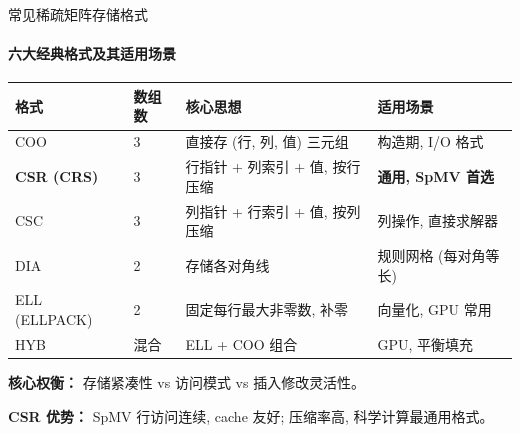 \documentclass[12pt,aspectratio=169]{beamer}
\begin{document}
\begin{frame}[shrink]{常见稀疏矩阵存储格式}
\framesubtitle{六大经典格式及其适用场景}

\footnotesize
\begin{center}
\renewcommand{\arraystretch}{1.15}
\setlength{\tabcolsep}{3pt}
\begin{tabular}{@{}p{2.3cm} p{1.6cm} p{4.6cm} p{3.6cm}@{}}
\toprule
\textbf{格式} & \textbf{数组数} & \textbf{核心思想} & \textbf{适用场景} \\
\midrule
COO              & 3 & 直接存 (行, 列, 值) 三元组             & 构造期, I/O 格式 \\
\textbf{CSR (CRS)} & 3 & 行指针 + 列索引 + 值, 按行压缩       & \textbf{通用, SpMV 首选} \\
CSC              & 3 & 列指针 + 行索引 + 值, 按列压缩         & 列操作, 直接求解器 \\
DIA              & 2 & 存储各对角线                            & 规则网格 (每对角等长) \\
ELL (ELLPACK)    & 2 & 固定每行最大非零数, 补零                & 向量化, GPU 常用 \\
HYB              & 混合 & ELL + COO 组合                       & GPU, 平衡填充 \\
\bottomrule
\end{tabular}
\end{center}
\normalsize

\vspace{4pt}
\small
\textbf{核心权衡：} 存储紧凑性 vs 访问模式 vs 插入修改灵活性。

\textbf{CSR 优势：} SpMV 行访问连续, cache 友好; 压缩率高, 科学计算最通用格式。
\end{frame}
\end{document}
